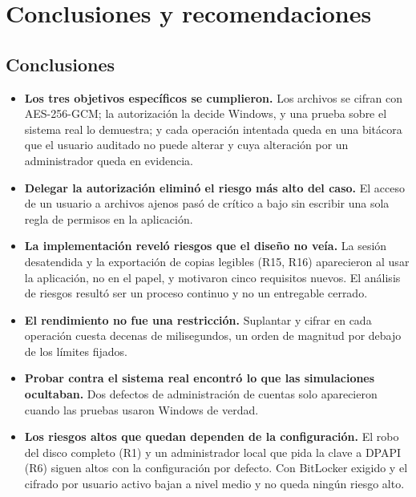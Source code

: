 \documentclass[conference]{IEEEtran}
\begin{document}
\section{Conclusiones y recomendaciones}
\label{sec:conclusiones}

\subsection{Conclusiones}
\begin{itemize}
    \item \textbf{Los tres objetivos específicos se cumplieron.} Los archivos se cifran con AES-256-GCM; la autorización la decide Windows, y una prueba sobre el sistema real lo demuestra; y cada operación intentada queda en una bitácora que el usuario auditado no puede alterar y cuya alteración por un administrador queda en evidencia.
    \item \textbf{Delegar la autorización eliminó el riesgo más alto del caso.} El acceso de un usuario a archivos ajenos pasó de crítico a bajo sin escribir una sola regla de permisos en la aplicación.
    \item \textbf{La implementación reveló riesgos que el diseño no veía.} La sesión desatendida y la exportación de copias legibles (R15, R16) aparecieron al usar la aplicación, no en el papel, y motivaron cinco requisitos nuevos. El análisis de riesgos resultó ser un proceso continuo y no un entregable cerrado.
    \item \textbf{El rendimiento no fue una restricción.} Suplantar y cifrar en cada operación cuesta decenas de milisegundos, un orden de magnitud por debajo de los límites fijados.
    \item \textbf{Probar contra el sistema real encontró lo que las simulaciones ocultaban.} Dos defectos de administración de cuentas solo aparecieron cuando las pruebas usaron Windows de verdad.
    \item \textbf{Los riesgos altos que quedan dependen de la configuración.} El robo del disco completo (R1) y un administrador local que pida la clave a DPAPI (R6) siguen altos con la configuración por defecto. Con BitLocker exigido y el cifrado por usuario activo bajan a nivel medio y no queda ningún riesgo alto.
\end{itemize}
\end{document}
